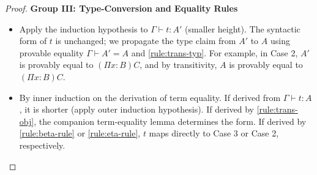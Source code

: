 \begin{proof}
    \newpage
    \noindent
    \textbf{Group III: Type-Conversion and Equality Rules}
    \begin{itemize}
        \item[\ref{rule:conv1}]
        Apply the induction hypothesis to $\Gamma \vdash t \colon A'$ (smaller height). The syntactic form of $t$ is unchanged; we propagate the type claim from $A'$ to $A$ using provable equality $\Gamma \vdash A' = A$ and \ref{rule:trans-typ}. For example, in Case 2, $A'$ is provably equal to $(\Pi x\colon B)C$, and by transitivity, $A$ is provably equal to $(\Pi x\colon B)C$. 
        
        \item[\ref{rule:refl-obj}] 
        By inner induction on the derivation of term equality. If derived from $\Gamma \vdash t\colon A$, it is shorter (apply outer induction hypothesis). If derived by \ref{rule:trans-obj}, the companion term-equality lemma determines the form. If derived by \ref{rule:beta-rule} or \ref{rule:eta-rule}, $t$ maps directly to Case 3 or Case 2, respectively. \qedhere
    \end{itemize}
\end{proof}